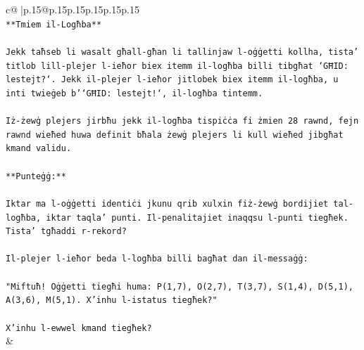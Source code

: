 \documentclass{article}
\begin{document}
{\begin{supertabular}{c@{$\;$}|p{.15\linewidth}@{}p{.15\linewidth}p{.15\linewidth}p{.15\linewidth}p{.15\linewidth}p{.15\linewidth}}
{{{\\ 
\texttt{**Tmiem il{-}Logħba**} \\
\\ 
\texttt{Jekk taħseb li wasalt għall{-}għan li tallinjaw l{-}oġġetti kollha, tista' titlob lill{-}plejer l{-}ieħor biex itemm il{-}logħba billi tibgħat `GĦID: lestejt?`. Jekk il{-}plejer l{-}ieħor jitlobek biex itemm il{-}logħba, u inti twieġeb b'`GĦID: lestejt!`, il{-}logħba tintemm.} \\
\\ 
\texttt{Iż{-}żewġ plejers jirbħu jekk il{-}logħba tispiċċa fi żmien 28 rawnd, fejn rawnd wieħed huwa definit bħala żewġ plejers li kull wieħed jibgħat kmand validu.} \\
\\ 
\texttt{**Punteġġ:**} \\
\\ 
\texttt{Iktar ma l{-}oġġetti identiċi jkunu qrib xulxin fiż{-}żewġ bordijiet tal{-}logħba, iktar taqla' punti. Il{-}penalitajiet inaqqsu l{-}punti tiegħek. Tista' tgħaddi r{-}rekord?} \\
\\ 
\texttt{Il{-}plejer l{-}ieħor beda l{-}logħba billi bagħat dan il{-}messaġġ:} \\
\\ 
\texttt{"Miftuħ! Oġġetti tiegħi huma: P(1,7), O(2,7), T(3,7), S(1,4), D(5,1), A(3,6), M(5,1). X'inhu l{-}istatus tiegħek?"} \\
\\ 
\texttt{X'inhu l{-}ewwel kmand tiegħek?} \\
            }
        }
    }
    & \\ \\


\end{supertabular}}
\end{document}
